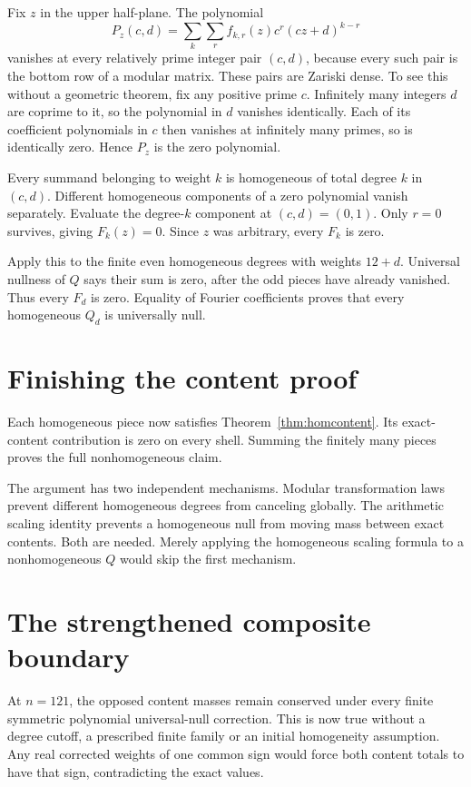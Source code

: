 Fix $z$ in the upper half-plane. The polynomial
\begin{equation}\label{eq:weightpolynomial}
P_z(c,d)=\sum_k\sum_r f_{k,r}(z)c^r(cz+d)^{k-r}
\end{equation}
vanishes at every relatively prime integer pair $(c,d)$, because every such pair is the bottom row of a modular matrix. These pairs are Zariski dense. To see this without a geometric theorem, fix any positive prime $c$. Infinitely many integers $d$ are coprime to it, so the polynomial in $d$ vanishes identically. Each of its coefficient polynomials in $c$ then vanishes at infinitely many primes, so is identically zero. Hence $P_z$ is the zero polynomial.

Every summand belonging to weight $k$ is homogeneous of total degree $k$ in $(c,d)$. Different homogeneous components of a zero polynomial vanish separately. Evaluate the degree-$k$ component at $(c,d)=(0,1)$. Only $r=0$ survives, giving $F_k(z)=0$. Since $z$ was arbitrary, every $F_k$ is zero.

Apply this to the finite even homogeneous degrees with weights $12+d$. Universal nullness of $Q$ says their sum is zero, after the odd pieces have already vanished. Thus every $F_d$ is zero. Equality of Fourier coefficients proves that every homogeneous $Q_d$ is universally null.

\section{Finishing the content proof}
Each homogeneous piece now satisfies Theorem~\ref{thm:homcontent}. Its exact-content contribution is zero on every shell. Summing the finitely many pieces proves the full nonhomogeneous claim.

The argument has two independent mechanisms. Modular transformation laws prevent different homogeneous degrees from canceling globally. The arithmetic scaling identity prevents a homogeneous null from moving mass between exact contents. Both are needed. Merely applying the homogeneous scaling formula to a nonhomogeneous $Q$ would skip the first mechanism.

\section{The strengthened composite boundary}
At $n=121$, the opposed content masses remain conserved under every finite symmetric polynomial universal-null correction. This is now true without a degree cutoff, a prescribed finite family or an initial homogeneity assumption. Any real corrected weights of one common sign would force both content totals to have that sign, contradicting the exact values.

